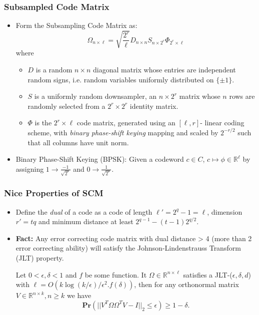 \documentclass[9pt]{beamer}
\newcommand{\mB}{\mathbb}
\begin{document}
\begin{frame}
\frametitle{Subsampled Code Matrix} 
\begin{itemize} 
\item Form the Subsampling Code Matrix as:
\[ \Omega_{n \times \ell} = \sqrt{ \frac{2^r}{\ell}} D_{n \times n} S_{n \times 2^r} \Phi_{2^r \times \ell} \]
where

\begin{itemize}
\item $D$ is a random $n \times n$ diagonal matrix whose entries are independent random signs, i.e. random variables uniformly distributed on $\{ \pm 1 \}$.
\vspace{3mm}

\item $S$ is a uniformly random downsampler, an $n \times 2^r$ matrix whose $n$ rows are randomly selected from a $2^r \times 2^r$ identity matrix.
\vspace{3mm}

\item $\Phi$ is the $2^r \times \ell$ code matrix, generated using an $[ \ell, r ]$- linear coding scheme, with \textit{binary phase-shift keying} mapping and scaled by $2^{-r/2}$ such that all columns have unit norm.
\vspace{3mm}

\end{itemize}

\item Binary Phase-Shift Keying (BPSK): Given a codeword $c \in C$, $c \mapsto \phi \in \mB{R}^{\ell}$ by assigning $1 \to \frac{-1}{\sqrt{2^r}}$ and $0 \to \frac{1}{\sqrt{2^r}}$.
\end{itemize}

\end{frame}

\begin{frame}
\frametitle{Nice Properties of SCM} 
\begin{itemize} 
\item Define the \textit{dual} of a code as a code of length $\ell' = 2^q - 1 = \ell$, dimension $r' = tq$ and minimum distance at least $2^{q-1} - (t - 1)2^{q/2}$.
\vspace{3mm}

\item \textbf{Fact:} Any error correcting code matrix with dual distance > 4 (more than 2 error correcting ability) will satisfy the Johnson-Lindenstrauss Transform (JLT) property.
\vspace{3mm}

\begin{lemma}
Let $0< \epsilon, \delta < 1$ and $f$ be some function. It $\Omega \in \mB{R}^{n \times \ell}$ satisfies a JLT-($\epsilon, \delta, d$) with $\ell = O(k \log(k /\epsilon)/\epsilon^2. f(\delta))$, then for any orthonormal matrix $V \in \mB{R}^{n \times k}, n \ge k$ we have 
\[ \textbf{Pr}(|| V^T \Omega \Omega^TV - I||_2 \le \epsilon) \ge 1 - \delta. \]
\end{lemma}
\end{itemize}
\end{frame}
\end{document}
